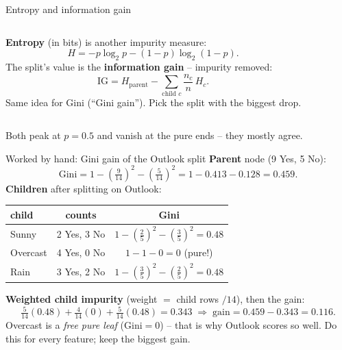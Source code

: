 \documentclass[aspectratio=169]{beamer}
\begin{document}
\begin{frame}{Entropy and information gain}
  \begin{columns}[T]
    \textbf{Entropy} (in bits) is another impurity measure:
    \[
      H = -p\log_2 p - (1-p)\log_2(1-p).
    \]
    The split's value is the \textbf{information gain} -- impurity removed:
    \[
      \mathrm{IG} = H_{\text{parent}} - \!\!\sum_{\text{child } c} \frac{n_c}{n}\, H_c .
    \]
    \footnotesize Same idea for Gini (``Gini gain''). Pick the split with the biggest
    drop.
    \begin{center}
    \end{center}
  \end{columns}
  \vskip 2pt
  \footnotesize Both peak at $p=0.5$ and vanish at the pure ends -- they mostly agree.
\end{frame}

\begin{frame}{Worked by hand: Gini gain of the Outlook split}
  \textbf{Parent} node (9 Yes, 5 No):
  \[
    \text{Gini} = 1 - \left(\tfrac{9}{14}\right)^2 - \left(\tfrac{5}{14}\right)^2
      = 1 - 0.413 - 0.128 = \mathbf{0.459}.
  \]
  \textbf{Children} after splitting on Outlook:
  \vskip -4pt
  \begin{center}\small
    \renewcommand{\arraystretch}{1.2}
    \begin{tabular}{l c c}
      child & counts & Gini \\
      \hline
      Sunny & 2 Yes, 3 No & $1-(\tfrac{2}{5})^2-(\tfrac{3}{5})^2 = 0.48$ \\
      Overcast & 4 Yes, 0 No & $1-1-0 = 0$ \;(pure!) \\
      Rain & 3 Yes, 2 No & $1-(\tfrac{3}{5})^2-(\tfrac{2}{5})^2 = 0.48$ \\
      \hline
    \end{tabular}
  \end{center}
  \vskip 2pt
  \textbf{Weighted child impurity} (weight $=$ child rows $/14$), then the gain:
  \[
    \tfrac{5}{14}(0.48) + \tfrac{4}{14}(0) + \tfrac{5}{14}(0.48) = 0.343
    \;\Rightarrow\; \text{gain} = 0.459 - 0.343 = \mathbf{0.116}.
  \]
  \footnotesize Overcast is a \emph{free pure leaf} ($\text{Gini}=0$) -- that is why
  Outlook scores so well. Do this for every feature; keep the biggest gain.
\end{frame}
\end{document}
